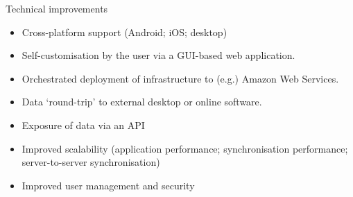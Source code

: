 \documentclass[aspectratio=169, 12pt]{beamer} %
\begin{document}
\begin{frame}{Technical improvements}
    \begin{itemize}[label=\textbullet]
        \item Cross-platform support (Android; iOS; desktop)
        \item Self-customisation by the user via a GUI-based web application.
        \item Orchestrated deployment of infrastructure to (e.g.) Amazon Web Services.
        \item Data `round-trip' to external desktop or online software.
        \item Exposure of data via an API
        \item Improved scalability (application performance; synchronisation performance; server-to-server synchronisation)
        \item Improved user management and security
    \end{itemize}
\end{frame}
\end{document}

